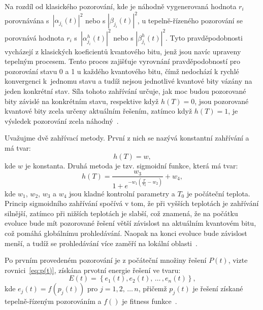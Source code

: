 Na rozdíl od klasického pozorování, kde je náhodně vygenerovaná hodnota $r_i$ porovnávána s~$\left|\alpha_{j_i}\left(t\right) \right|^2$ nebo s $\left|\beta_{j_i}\left(t\right) \right|^2$, u tepelně-řízeného pozorování se porovnává hodnota $r_i$ s~$\left|\alpha_{j_i}^h\left(t\right) \right|^2$ nebo s $\left|\beta_{j_i}^h\left(t\right) \right|^2$. 
Tyto pravděpodobnosti vycházejí z klasických koeficientů kvantového bitu, jenž jsou navíc upraveny tepelným procesem. 
Tento proces zajišťuje vyrovnání pravděpodobností pro pozorování stavu 0 a 1 u každého kvantového bitu, čímž nedochází k rychlé konvergenci k~jednomu stavu a tudíž nejsou jednotlivé kvantové bity vázány na jeden konkrétní stav. 
Síla tohoto zahřívání určuje, jak moc budou pozorované bity závislé na konkrétním stavu, respektive když $h\left(T\right) = 0$, jsou pozorované kvantové bity zcela určeny aktuálním řešením, zatímco když $h\left(T\right) = 1$, je výsledek pozorování zcela náhodný~\cite{qisa}. 

Uvažujme dvě zahřívací metody. První z nich se nazývá konstantní zahřívání a má tvar:
\begin{equation}\label{eq:qisa-const}
    h\left(T\right) = w,
\end{equation}
kde $w$ je konstanta. Druhá metoda je tzv. sigmoidní funkce, která má tvar:
\begin{equation}\label{eq:qisa-sigmo}
    h\left(T\right) = \frac{w_3}{1 + e^{-w_1 \left(\frac{T}{T_0} - w_2 \right)}} + w_4,
\end{equation}
kde $w_1$, $w_2$, $w_3$ a $w_4$ jsou kladné kontrolní parametry a $T_0$ je počáteční teplota. 
Princip sigmoidního zahřívání spočívá v tom, že při vyšších teplotách je zahřívání silnější, zatímco při nižších teplotách je slabší, což znamená, že na počátku evoluce bude mít pozorované řešení větší závislost na aktuálním kvantovém bitu, což pomáhá globálnímu prohledávání. 
Naopak na konci evoluce bude závislost menší, a tudíž se prohledávání více zaměří na lokální oblasti~\cite{qisa}. 

Po prvním provedeném pozorování je z počáteční množiny řešení $P\left(t\right)$, vizte rovnici~\ref{eq:p(t)}, získána prvotní energie řešení ve tvaru:
\begin{equation*}
    E\left(t\right) = \left\{ e_1\left(t\right), e_2\left(t\right),\,\dots\,, e_n\left(t\right) \right\},
\end{equation*}
kde $e_j \left( t \right) = f\left( p_j \left( t \right) \right)$ pro $j = 1,2,\,\dots\,n$, přičemž $p_j\left( t \right)$ je řešení získané tepelně-řízeným pozorováním a $f\left( \right)$ je fitness funkce~\cite{qisa}.

